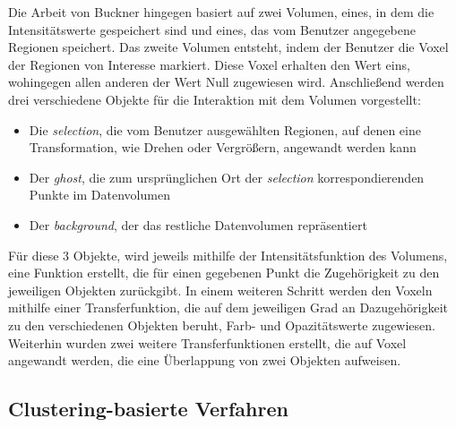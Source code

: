 Die Arbeit von Buckner \cite{bruckner2005volumeshop} hingegen basiert auf zwei Volumen, eines, in dem die Intensitätswerte gespeichert sind und eines, das vom Benutzer angegebene Regionen speichert.
Das zweite Volumen entsteht, indem der Benutzer die Voxel der Regionen von Interesse markiert. Diese Voxel erhalten den Wert eins, wohingegen allen anderen der Wert Null zugewiesen wird.
Anschließend werden drei verschiedene Objekte für die Interaktion mit dem Volumen vorgestellt:

\begin{itemize}
\item Die \textit{selection}, die vom Benutzer ausgewählten Regionen, auf denen eine Transformation, wie Drehen oder Vergrößern, angewandt werden kann
\item Der \textit{ghost}, die zum ursprünglichen Ort der \textit{selection} korrespondierenden Punkte im Datenvolumen
\item Der \textit{background}, der das restliche Datenvolumen repräsentiert
\end{itemize}

Für diese 3 Objekte, wird jeweils mithilfe der Intensitätsfunktion des Volumens, eine Funktion erstellt, die für einen gegebenen Punkt die Zugehörigkeit zu den jeweiligen Objekten zurückgibt.
\newline
In einem weiteren Schritt werden den Voxeln mithilfe einer Transferfunktion, die auf dem jeweiligen Grad an Dazugehörigkeit zu den verschiedenen Objekten beruht, Farb- und Opazitätswerte zugewiesen.
Weiterhin wurden zwei weitere Transferfunktionen erstellt, die auf Voxel angewandt werden, die eine Überlappung von zwei Objekten aufweisen.



\subsection{Clustering-basierte Verfahren}

